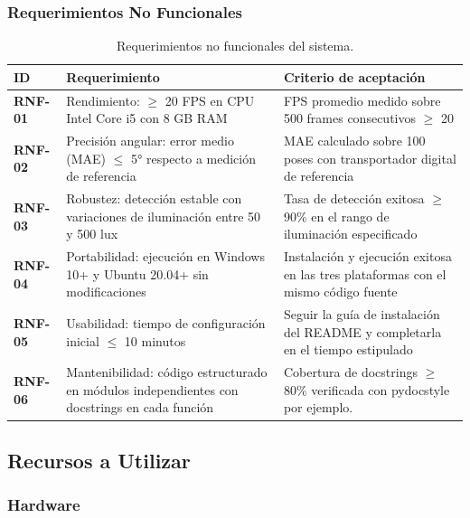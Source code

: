 \subsubsection*{Requerimientos No Funcionales}

\begin{table}[H]
\centering
\label{tab:req_nofunc}
\renewcommand{\arraystretch}{1.3}
\begin{tabularx}{\textwidth}{
    >{\bfseries}p{1.1cm}
    X
    X
}
\toprule
\textbf{ID} &
\textbf{Requerimiento} &
\textbf{Criterio de aceptación} \\
\midrule
RNF-01 &
  Rendimiento: $\geq$ 20 FPS en CPU Intel Core i5 con 8 GB RAM &
  FPS promedio medido sobre 500 frames consecutivos $\geq$ 20 \\
\midrule
RNF-02 &
  Precisión angular: error medio (MAE) $\leq$ 5° respecto a medición
  de referencia &
  MAE calculado sobre 100 poses con transportador digital de referencia \\
\midrule
RNF-03 &
  Robustez: detección estable con variaciones de iluminación entre
  50 y 500 lux &
  Tasa de detección exitosa $\geq$ 90\% en el rango de iluminación
  especificado \\
\midrule
RNF-04 &
  Portabilidad: ejecución en Windows 10+ y Ubuntu 20.04+
  sin modificaciones &
  Instalación y ejecución exitosa en las tres plataformas con el mismo
  código fuente \\
\midrule
RNF-05 &
  Usabilidad: tiempo de configuración inicial $\leq$ 10 minutos &
  Seguir la guía de instalación del README y completarla en el tiempo
  estipulado \\
\midrule
RNF-06 &
  Mantenibilidad: código estructurado en módulos independientes con
  docstrings en cada función &
  Cobertura de docstrings $\geq$ 80\% verificada con pydocstyle por ejemplo. \\
\bottomrule
\end{tabularx}
\caption{Requerimientos no funcionales del sistema.}
\end{table}

\subsection{Recursos a Utilizar}

\subsubsection*{Hardware}

